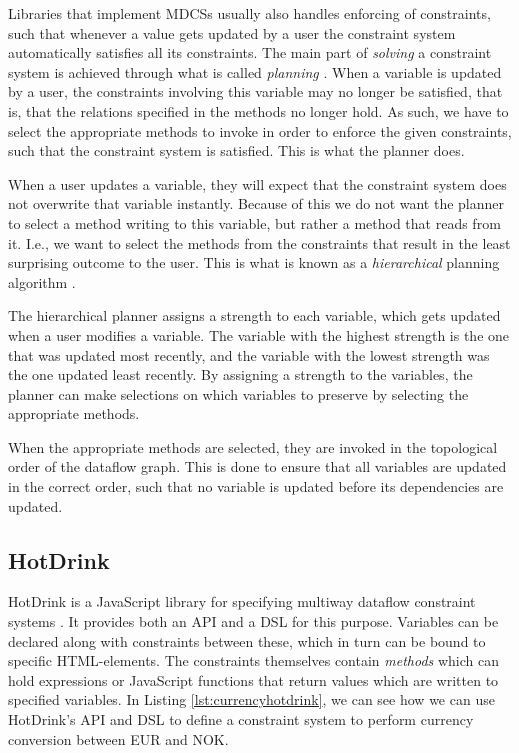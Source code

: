 \documentclass[11pt, a4paper]{article}
\begin{document}
Libraries that implement MDCSs usually also handles enforcing of constraints, such that whenever a value gets updated by a user the constraint system automatically satisfies all its constraints. The main part of \textit{solving} a constraint system is achieved through what is called \textit{planning} \cite{planners}. When a variable is updated by a user, the constraints involving this variable may no longer be satisfied, that is, that the relations specified in the methods no longer hold. As such, we have to select the appropriate methods to invoke in order to enforce the given constraints, such that the constraint system is satisfied. This is what the planner does.

When a user updates a variable, they will expect that the constraint system does not overwrite that variable instantly. Because of this we do not want the planner to select a method writing to this variable, but rather a method that reads from it. I.e., we want to select the methods from the constraints that result in the least surprising outcome to the user. This is what is known as a \textit{hierarchical} planning algorithm \cite{planners}.

The hierarchical planner assigns a strength to each variable, which gets updated when a user modifies a variable. The variable with the highest strength is the one that was updated most recently, and the variable with the lowest strength was the one updated least recently. By assigning a strength to the variables, the planner can make selections on which variables to preserve by selecting the appropriate methods.

When the appropriate methods are selected, they are invoked in the topological order of the dataflow graph. This is done to ensure that all variables are updated in the correct order, such that no variable is updated before its dependencies are updated.

\subsection{HotDrink}
\label{sec:hotdrink}
HotDrink is a JavaScript library for specifying multiway dataflow constraint systems \cite{hotdrink}. It provides both an API and a DSL for this purpose. Variables can be declared along with constraints between these, which in turn can be bound to specific HTML-elements. The constraints themselves contain \textit{methods} which can hold expressions or JavaScript functions that return values which are written to specified variables. In Listing \ref{lst:currencyhotdrink}, we can see how we can use HotDrink's API and DSL to define a constraint system to perform currency conversion between EUR and NOK.
\end{document}
